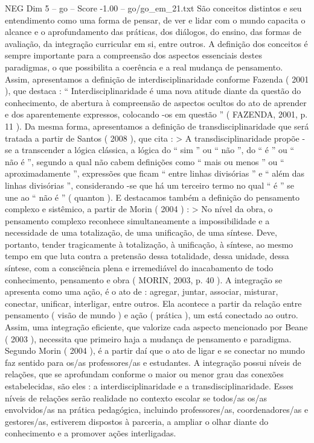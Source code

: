 \begin{textsample}{NEG Dim 5 – go – Score -1.00 – go/go\_em\_21.txt}
São conceitos distintos e seu entendimento como uma forma de pensar, de ver e lidar com o mundo capacita o alcance e o aprofundamento das práticas, dos diálogos, do ensino, das formas de avaliação, da integração curricular em si, entre outros.
A definição dos conceitos é sempre importante para a compreensão dos aspectos essenciais destes paradigmas, o que possibilita a coerência e a real mudança de pensamento.
Assim, apresentamos a definição de interdisciplinaridade conforme Fazenda ( 2001 ), que destaca : “ Interdisciplinaridade é uma nova atitude diante da questão do conhecimento, de abertura à compreensão de aspectos ocultos do ato de aprender e dos aparentemente expressos, colocando -os em questão ” ( FAZENDA, 2001, p. 11 ).
Da mesma forma, apresentamos a definição de transdisciplinaridade que será tratada a partir de Santos ( 2008 ), que cita : > A transdisciplinaridade propõe -se a transcender a lógica clássica, a lógica do “ sim ” ou “ não ”, do “ é ” ou “ não é ”, segundo a qual não cabem definições como “ mais ou menos ” ou “ aproximadamente ”, expressões que ficam “ entre linhas divisórias ” e “ além das linhas divisórias ”, considerando -se que há um terceiro termo no qual “ é ” se une ao “ não é ” ( quanton ).
E destacamos também a definição do pensamento complexo e sistêmico, a partir de Morin ( 2004 ) : > No nível da obra, o pensamento complexo reconhece simultaneamente a impossibilidade e a necessidade de uma totalização, de uma unificação, de uma síntese.
Deve, portanto, tender tragicamente à totalização, à unificação, à síntese, ao mesmo tempo em que luta contra a pretensão dessa totalidade, dessa unidade, dessa síntese, com a consciência plena e irremediável do inacabamento de todo conhecimento, pensamento e obra ( MORIN, 2003, p. 40 ).
A integração se apresenta como uma ação, é o ato de : agregar, juntar, associar, misturar, conectar, unificar, interligar, entre outros.
Ela acontece a partir da relação entre pensamento ( visão de mundo ) e ação ( prática ), um está conectado ao outro.
Assim, uma integração eficiente, que valorize cada aspecto mencionado por Beane ( 2003 ), necessita que primeiro haja a mudança de pensamento e paradigma.
Segundo Morin ( 2004 ), é a partir daí que o ato de ligar e se conectar no mundo faz sentido para os/as professores/as e estudantes.
A integração possui níveis de relações, que se aprofundam conforme o maior ou menor grau das conexões estabelecidas, são eles : a interdisciplinaridade e a transdisciplinaridade.
Esses níveis de relações serão realidade no contexto escolar se todos/as os/as envolvidos/as na prática pedagógica, incluindo professores/as, coordenadores/as e gestores/as, estiverem dispostos à parceria, a ampliar o olhar diante do conhecimento e a promover ações interligadas.

\end{textsample}
